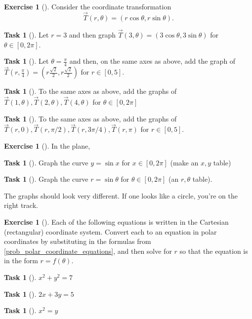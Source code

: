 \documentclass[10pt,]{book}
\theoremstyle{plain}
\theoremstyle{definition}
\theoremstyle{definition}
\theoremstyle{definition}
\theoremstyle{definition}
\newtheorem{exploration}[project]{Exercise}
\newtheorem{task}[project]{Task}
\theoremstyle{definition}
\numberwithin{equation}{section}
\begin{document}
\begin{exploration}[]\label{polar_coordinate_transformation_graph}
Consider the coordinate transformation%
\begin{equation*}
\vec T(r,\theta) = (r\cos\theta,r\sin\theta).
\end{equation*}
%
\begin{task}[]\label{task-143}
Let \(r=3\) and then graph \(\vec T(3,\theta)=(3\cos\theta,3\sin\theta)\) for \(\theta\in[0,2\pi]\).%
\end{task}
\begin{task}[]\label{task-144}
Let \(\theta=\frac{\pi}{4}\) and then, on the same axes as above, add the graph of \(\vec T\left(r,\frac{\pi}{4}\right)=\left(r\frac{\sqrt 2}{2},r \frac{\sqrt 2}{2}\right)\) for \(r\in[0,5]\).%
\end{task}
\begin{task}[]\label{task-145}
To the same axes as above, add the graphs of \(\vec T(1,\theta), \vec T(2,\theta), \vec T(4,\theta)\)  for \(\theta\in[0,2\pi]\)%
\end{task}
\begin{task}[]\label{task-146}
To the same axes as above, add the graphs of \(\vec T(r,0), \vec T(r,\pi/2), \vec T(r,3\pi/4), \vec T(r,\pi)\) for \(r\in[0,5]\).%
\end{task}
\end{exploration}
\begin{exploration}[]\label{exploration-88}
In the plane,%
\begin{task}[]\label{task-147}
Graph the curve \(y=\sin x\) for \(x\in[0,2\pi]\) (make an \(x,y\) table)%
\end{task}
\begin{task}[]\label{task-148}
Graph the curve \(r=\sin\theta\) for \(\theta\in[0,2\pi]\) (an \(r,\theta\) table).%
\end{task}
The graphs should look very different. If one looks like a circle, you're on the right track.%
\end{exploration}
\begin{exploration}[]\label{exploration-89}
Each of the following equations is written in the Cartesian (rectangular) coordinate system. Convert each to an equation in polar coordinates by substituting in the formulas from \hyperref[prob_polar_coordinate_equations]{\ref{prob_polar_coordinate_equations}}, and then solve for \(r\) so that the equation is in the form \(r=f(\theta)\).%
\begin{task}[]\label{task-149}
\(x^2+y^2=7\)%
\end{task}
\begin{task}[]\label{task-150}
\(2x+3y=5\)%
\end{task}
\begin{task}[]\label{task-151}
\(x^2=y\)%
\end{task}
\end{exploration}
\end{document}
